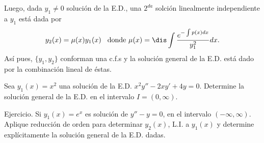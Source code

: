 \documentclass{beamer}
\begin{document}
\begin{frame}[t]
	\begin{block}{}
		Luego, dada \(y_1 \ne 0\) solución de la E.D., una \(2^{da}\) solción linealmente independiente a \(y_1\) está dada por
		\[
			y_2(x) = \mu (x) y_1(x) \hspace{3mm} \mbox{donde } \mu (x) = \dis\int \dfrac{e^{-\int p(x) dx}}{y_1^2}dx.
		\]
		Así pues, \(\{y_1,y_2\}\) conforman una c.f.s y la solución general de la E.D. está dado por la combinación lineal de éstas.
	\end{block} \vspace{2mm}
	\begin{example}
		Sea \(y_1(x) = x^2\) una solución de la E.D. \(x^2y'' -2xy' +4y=0\). Determine la solución general de la E.D. en el intervalo \(I=(0, \infty)\).
	\end{example}
\end{frame}
\begin{frame}[t]
\end{frame}

\begin{frame}[t]
	\begin{alertblock}{Ejercicio.}
		Si \(y_1(x) = e^x\) es solución de \(y'' -y=0\), en el intervalo \((- \infty , \infty)\). Aplique reducción de orden para determinar \(y_2(x)\), L.I. a \(y_1(x)\) y determine explícitamente la solución general de la E.D. dadas.
	\end{alertblock}
\end{frame}
\end{document}
